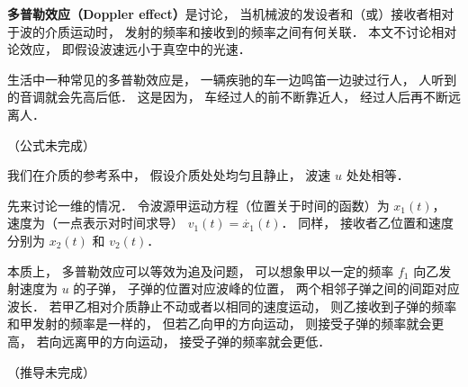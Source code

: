 
\textbf{多普勒效应（Doppler effect）}是讨论， 当机械波的发设者和（或）接收者相对于波的介质运动时， 发射的频率和接收到的频率之间有何关联． 本文不讨论相对论效应， 即假设波速远小于真空中的光速．

生活中一种常见的多普勒效应是， 一辆疾驰的车一边鸣笛一边驶过行人， 人听到的音调就会先高后低． 这是因为， 车经过人的前不断靠近人， 经过人后再不断远离人．

（公式未完成）

我们在介质的参考系中， 假设介质处处均匀且静止， 波速 $u$ 处处相等．

先来讨论一维的情况． 令波源甲运动方程（位置关于时间的函数）为 $x_1(t)$， 速度为（一点表示对时间求导） $v_1(t) = \dot{x_1}(t)$． 同样， 接收者乙位置和速度分别为 $x_2(t)$ 和 $v_2(t)$．

本质上， 多普勒效应可以等效为追及问题， 可以想象甲以一定的频率 $f_1$ 向乙发射速度为 $u$ 的子弹， 子弹的位置对应波峰的位置， 两个相邻子弹之间的间距对应波长． 若甲乙相对介质静止不动或者以相同的速度运动， 则乙接收到子弹的频率和甲发射的频率是一样的， 但若乙向甲的方向运动， 则接受子弹的频率就会更高， 若向远离甲的方向运动， 接受子弹的频率就会更低．

（推导未完成）
